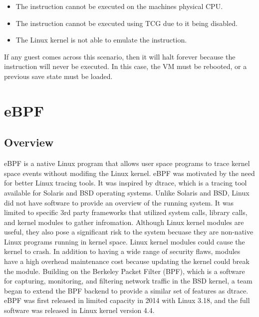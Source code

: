 \documentclass{report}
\begin{document}
\begin{spacing}{1.5}
{\begin{itemize}
\item  The instruction cannot be executed on the machines physical CPU.
\item  The instruction cannot be executed using TCG due to it being disabled.
\item  The Linux kernel is not able to emulate the instruction.

\end{itemize}

\leavevmode\newline
If any guest comes across this scenario, then it will halt forever because the instruction will never be executed. In this case, the VM must be rebooted, or a previous save state must be loaded.
}








\section{eBPF}

\subsection{Overview}

{\large
eBPF is a native Linux program that allows user space programs to trace kernel space events without modifing the Linux kernel. eBPF was motivated by the need for better Linux tracing tools. It was inspired by dtrace, which is a tracing tool available for Solaris and BSD operating systems. Unlike Solaris and BSD, Linux did not have software to provide an overview of the running system. It was limited to specific 3rd party frameworks that utilized system calls, library calls, and kernel modules to gather infromation. Although Linux kernel modules are useful, they also pose a significant risk to the system becuase they are non-native Linux programs running in kernel space. Linux kernel modules could cause the kernel to crash. In addition to having a wide range of security flaws, modules have a high overhead maintenance cost because updating the kernel could break the module. Building on the Berkeley Packet Filter (BPF), which is a software for capturing, monitoring, and filtering network traffic in the BSD kernel, a team began to extend the BPF backend to provide a similar set of features as dtrace. eBPF was first released in limited capacity in 2014 with Linux 3.18, and the full software was released in Linux kernel version 4.4.
\newline
}


\end{spacing}
\end{document}
